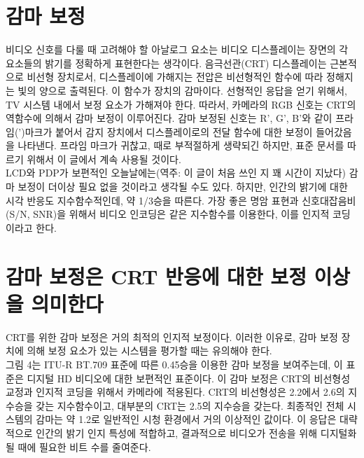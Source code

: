 \section{감마 보정}
비디오 신호를 다룰 때 고려해야 할 아날로그 요소는 비디오 디스플레이는 장면의 각 요소들의 밝기를 정확하게 표현한다는 생각이다.
음극선관(CRT) 디스플레이는 근본적으로 비선형 장치로서, 디스플레이에 가해지는 전압은 비선형적인 함수에 따라 정해지는 빛의 양으로 출력된다.
이 함수가 장치의 감마이다. 선형적인 응답을 얻기 위해서, TV 시스템 내에서 보정 요소가 가해져야 한다.
따라서, 카메라의 RGB 신호는 CRT의 역함수에 의해서 감마 보정이 이루어진다. 감마 보정된 신호는 R', G', B'와 같이 프라임(')마크가 붙어서 감지 장치에서 디스플레이로의 전달 함수에 대한 보정이 들어갔음을 나타낸다.
프라임 마크가 귀찮고, 때로 부적절하게 생략되긴 하지만, 표준 문서를 따르기 위해서 이 글에서 계속 사용될 것이다.
\\
LCD와 PDP가 보편적인 오늘날에는(역주: 이 글이 처음 쓰인 지 꽤 시간이 지났다) 감마 보정이 더이상 필요 없을 것이라고 생각될 수도 있다.
하지만, 인간의 밝기에 대한 시각 반응도 지수함수적인데, 약 1/3승을 따른다. 가장 좋은 명암 표현과 신호대잡음비(S/N, SNR)을 위해서 비디오 인코딩은 같은 지수함수를 이용한다, 이를 인지적 코딩이라고 한다.

\section{감마 보정은 CRT 반응에 대한 보정 이상을 의미한다}
CRT를 위한 감마 보정은 거의 최적의 인지적 보정이다. 이러한 이유로, 감마 보정 장치에 의해 보정 요소가 있는 시스템을 평가할 때는 유의해야 한다.
\\
{그림 4}는 ITU-R BT.709 표준에 따른 0.45승을 이용한 감마 보정을 보여주는데, 이 표준은 디지털 HD 비디오에 대한 보편적인 표준이다.
이 감마 보정은 CRT의 비선형성 교정과 인지적 코딩을 위해서 카메라에 적용된다. CRT의 비선형성은 2.2에서 2.6의 지수승을 갖는 지수함수이고, 대부분의 CRT는 2.5의 지수승을 갖는다.
최종적인 전체 시스템의 감마는 약 1.2로 일반적인 시청 환경에서 거의 이상적인 값이다. 이 응답은 대략적으로 인간의 밝기 인지 특성에 적합하고, 결과적으로 비디오가 전송을 위해 디지털화될 때에 필요한 비트 수를 줄여준다.

